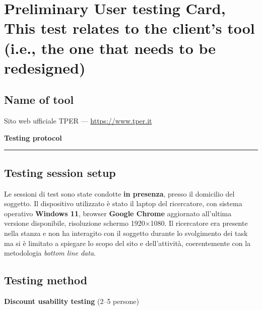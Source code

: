 \documentclass[11pt,a4paper]{article}
\begin{document}
\newpage

\section{Preliminary User testing Card, 
This test relates to the client's tool
(i.e., the one that needs to be redesigned)}

\vspace{0.2cm}

\subsection*{Name of tool}
\begin{tcolorbox}[colback=backgroundColor,colframe=borderColor,arc=2mm]
Sito web ufficiale TPER --- \url{https://www.tper.it}
\end{tcolorbox}

\vspace{0.2cm}

\begin{center}
  {\color{primaryColor}\large\bfseries Testing protocol}
  \vspace{0.1cm}
  \color{borderColor}\hrule
\end{center}

\vspace{0.2cm}

\subsection*{Testing session setup}
\begin{tcolorbox}[colback=backgroundColor,colframe=borderColor,arc=2mm]
Le sessioni di test sono state condotte \textbf{in presenza},
presso il domicilio del soggetto. Il dispositivo utilizzato è
stato il laptop del ricercatore, con sistema operativo
\textbf{Windows 11}, browser \textbf{Google Chrome} aggiornato
all'ultima versione disponibile, risoluzione schermo 1920×1080.
Il ricercatore era presente nella stanza e non ha interagito
con il soggetto durante lo svolgimento dei task ma si è limitato a spiegare lo scopo del sito e dell'attività, coerentemente
con la metodologia \textit{bottom line data}.
\end{tcolorbox}

\vspace{0.2cm}

\subsection*{Testing method}
\textbf{Discount usability testing} (2--5 persone)
\end{document}
